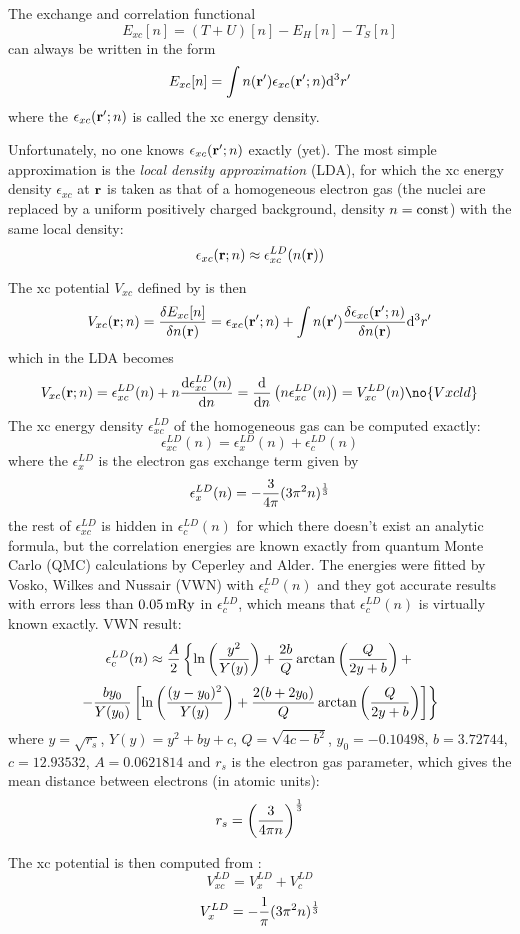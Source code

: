 The exchange and correlation functional
$$E_{xc}[n]=(T+U)[n]-E_H[n]-T_S[n]$$
can always be written in the form
$$E_{xc}[n]=\int n({\bf r}')\epsilon_{xc}({\bf r}';n){\rm d}^3r'$$
where the $\epsilon_{xc}({\bf r}';n)$ is called the xc energy density. 

Unfortunately, no one knows $\epsilon_{xc}({\bf r}';n)$ exactly (yet).  The
most simple approximation is the {\it local density approximation \/} (LDA),
for which the xc energy density $\epsilon_{xc}$ at $\bf r$ is taken as that of
a homogeneous electron gas (the nuclei are replaced by a uniform positively
charged background, density $n=\rm const$) with the same local density:
$$\epsilon_{xc}({\bf r};n)\approx\epsilon_{xc}^{LD}(n({\bf r}))$$

The xc potential $V_{xc}$ defined by  is then
$$V_{xc}({\bf r};n)={\delta E_{xc}[n]\over\delta n({\bf r})}=
\epsilon_{xc}({\bf r}';n)+
\int n({\bf r}'){\delta \epsilon_{xc}({\bf r}';n)\over\delta n({\bf r})}{\rm d}^3r'
$$
which in the LDA becomes
$$V_{xc}({\bf r};n)
=\epsilon_{xc}^{LD}(n)+n{\d \epsilon_{xc}^{LD}(n)\over \d n}=
{\d \over \d n}\left(n\epsilon_{xc}^{LD}(n)\right)=
V_{xc}^{LD}(n)
\no{Vxcld}$$
The xc energy density $\epsilon_{xc}^{LD}$ of the homogeneous gas can be
computed exactly\cite{martin}: 
$$\epsilon_{xc}^{LD}(n)=\epsilon_x^{LD}(n)+\epsilon_c^{LD}(n)$$
where the $\epsilon_x^{LD}$ is the electron gas exchange term given
by\cite{martin}
$$\epsilon_x^{LD}(n)=-{3\over4\pi}(3\pi^2 n)^{1\over3}$$
the rest of $\epsilon_{xc}^{LD}$ is hidden in $\epsilon_c^{LD}(n)$ for which
there doesn't exist an analytic formula, but the correlation energies are known
exactly from quantum Monte Carlo (QMC) calculations by Ceperley and
Alder\cite{pickett}. The energies were fitted by
Vosko, Wilkes and Nussair (VWN) with
$\epsilon_c^{LD}(n)$ and they got accurate results with errors less than
$0.05\rm\,mRy$ in $\epsilon_c^{LD}$, which means that $\epsilon_c^{LD}(n)$ is
virtually known exactly. VWN result:
$$\epsilon_c^{LD}(n)\approx {A\over2}\left\{
\ln\left(y^2\over Y(y)\right)+{2b\over Q}\arctan\left(Q\over 2y+b\right)+
\right.
$$
$$\left.
-{by_0\over Y(y_0)}\left[\ln\left((y-y_0)^2\over Y(y)\right)
+{2(b+2y_0)\over Q}\arctan\left(Q\over 2y+b\right)
\right] \right\}$$
where $y=\sqrt{r_s}$, $Y(y)=y^2+by+c$, $Q=\sqrt{4c-b^2}$, $y_0=-0.10498$,
$b=3.72744$, $c=12.93532$, $A=0.0621814$ and $r_s$ is the electron gas
parameter, which gives the mean distance between electrons (in atomic units):
$$r_s=\left(3\over4\pi n\right)^{1\over3}$$

The xc potential is then computed from :
$$V_{xc}^{LD}=V_x^{LD}+V_c^{LD}$$
$$V_x^{LD}=-{1\over\pi}(3\pi^2 n)^{1\over3}$$

